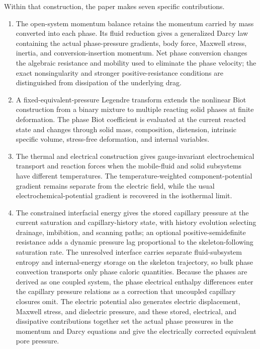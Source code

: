 Within that construction, the paper makes seven specific contributions.
%
\begin{enumerate}
	\item The open-system momentum balance retains the momentum carried by mass
	      converted into each phase.  Its fluid reduction gives a generalized
	      Darcy law containing the actual phase-pressure gradients, body
	      force, Maxwell stress, inertia, and conversion-insertion momentum.  Net
	      phase conversion changes the algebraic resistance and mobility used to
	      eliminate the phase velocity; the exact nonsingularity and stronger
	      positive-resistance conditions are distinguished from dissipation of the
	      underlying drag.

	\item A fixed-equivalent-pressure Legendre transform extends the nonlinear
	      Biot construction from a binary mixture to multiple reacting solid
	      phases at finite deformation.  The phase Biot coefficient is evaluated
	      at the current reacted state and changes through solid mass,
	      composition,
	      distension, intrinsic specific volume, stress-free deformation, and
	      internal variables.

	\item The thermal and electrical construction gives gauge-invariant
	      electrochemical transport and reaction forces when the mobile-fluid and
	      solid subsystems have different temperatures.  The
	      temperature-weighted component-potential gradient remains separate from
	      the electric field, while the usual electrochemical-potential gradient
	      is recovered in the isothermal limit.

	\item The constrained interfacial energy gives the stored capillary pressure
	      at the current saturation and capillary-history state, with history
	      evolution selecting drainage, imbibition, and scanning paths; an
	      optional positive-semidefinite resistance adds a dynamic pressure lag
	      proportional to the skeleton-following saturation rate.  The unresolved
	      interface carries separate fluid-subsystem entropy and internal-energy
	      storage on the skeleton trajectory, so bulk phase convection transports
	      only phase caloric quantities.  Because the
	      phases are derived as one coupled system, the phase electrical enthalpy
	      differences enter the capillary pressure relations as a correction that
	      uncoupled capillary closures omit.  The electric potential also
	      generates electric displacement, Maxwell stress, and dielectric
	      pressure, and these stored, electrical, and dissipative contributions
	      together set the actual phase pressures in the momentum and Darcy
	      equations and give the electrically corrected equivalent pore pressure.


\end{enumerate}
